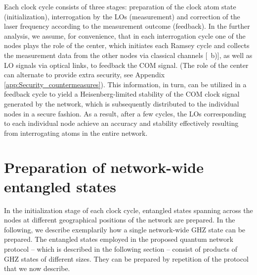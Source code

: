 Each clock cycle consists of three stages: preparation of the clock atom state
(initialization), interrogation by the LOs (measurement) and correction of the
laser frequency according to the measurement outcome (feedback).
In the further analysis, we assume, for convenience, that in each interrogation
cycle one of the nodes plays the role of the center, which initiates
each Ramsey cycle and collects the measurement data from the other nodes via
classical channels [~b)], as well as LO signals via optical links,
 to feedback the COM signal.
(The role of the center can alternate to provide extra security, see
 Appendix \ref{app:Security_countermeasures}). This information, in turn, can be utilized in a
 feedback cycle to yield a Heisenberg-limited stability of the COM clock signal
 generated by the network, which is
subsequently distributed to the individual nodes in a secure fashion.  As a
result, after a few cycles, the LOs corresponding to each individual node
achieve an accuracy and stability effectively resulting from interrogating atoms
in the entire network.



\section{Preparation of network-wide entangled states}
\label{sec:NWES}

In the initialization stage of each clock cycle, entangled states spanning
across the nodes at different geographical positions of the network are
prepared. In the following, we describe exemplarily how a single network-wide
GHZ state can be prepared. 
The entangled states employed in the proposed quantum network protocol -- which
is described in the following section -- consist of products of GHZ states of
different sizes. They can be prepared by repetition of the protocol that
we now describe.

